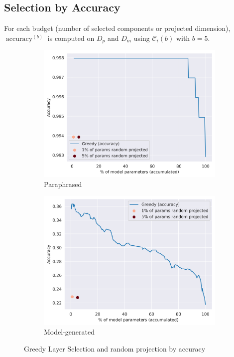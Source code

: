 \subsection{Selection by Accuracy}
For each budget (number of selected components or projected dimension), $\operatorname{accuracy}^{(b)}$ is computed on $D_p$ and $D_m$ using $\mathcal{C}_i(b)$ with $b=5$.
\begin{figure}[h]
    \centering
    \begin{subfigure}[h]{0.49\textwidth}
        \centering
        \includegraphics[width=\textwidth]{figures/results/paraphrased/greedy_layer_selection_accuracy.png}
        \caption{Paraphrased}
        \label{fig:greedy_layer_selection_accuracy_paraphrased}
    \end{subfigure}
    \hfill
    \begin{subfigure}[h]{0.49\textwidth}
        \centering
        \includegraphics[width=\textwidth]{figures/results/model-generated/greedy_layer_selection_accuracy.png}
        \caption{Model-generated}
        \label{fig:greedy_layer_selection_accuracy_model_generated}
    \end{subfigure}
    \caption{Greedy Layer Selection and random projection by accuracy}
    \label{fig:greedy_layer_selection_accuracy}
\end{figure}

